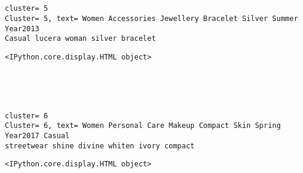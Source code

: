 \documentclass[11pt]{article}
\begin{document}
    
    \begin{center}
    \end{center}
    { \hspace*{\fill} \\}
    
    \begin{center}
    \end{center}
    { \hspace*{\fill} \\}
    
    \begin{Verbatim}[commandchars=\\\{\}]
cluster= 5
Cluster= 5, text= Women Accessories Jewellery Bracelet Silver Summer Year2013
Casual lucera woman silver bracelet
    \end{Verbatim}

    
    \begin{Verbatim}[commandchars=\\\{\}]
<IPython.core.display.HTML object>
    \end{Verbatim}

    
    \begin{center}
    \end{center}
    { \hspace*{\fill} \\}
    
    \begin{center}
    \end{center}
    { \hspace*{\fill} \\}
    
    \begin{Verbatim}[commandchars=\\\{\}]
cluster= 6
Cluster= 6, text= Women Personal Care Makeup Compact Skin Spring Year2017 Casual
streetwear shine divine whiten ivory compact
    \end{Verbatim}

    
    \begin{Verbatim}[commandchars=\\\{\}]
<IPython.core.display.HTML object>
    \end{Verbatim}
\end{document}
